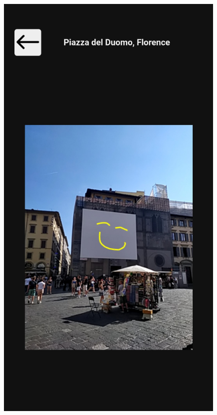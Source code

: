 \documentclass{beamer}
\begin{document}
\begin{frame}
\begin{columns}
\begin{itemize}
\begin{figure}[!h]
 			\includegraphics[scale=0.1]{"Immagini/slider_singola.jpg"}
 		\end{figure}
\end{itemize}
\end{columns}
\end{frame}
\end{document}
